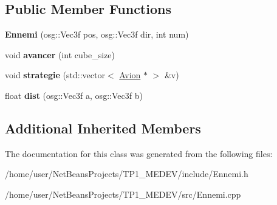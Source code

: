 \subsection*{Public Member Functions}
\begin{DoxyCompactItemize}
\item 
\hypertarget{classEnnemi_a8afacc285af46058850d5037cefd2d7b}{{\bfseries Ennemi} (osg\+::\+Vec3f pos, osg\+::\+Vec3f dir, int num)}\label{classEnnemi_a8afacc285af46058850d5037cefd2d7b}

\item 
\hypertarget{classEnnemi_a30f5463052d9349a4a3a561ca37b6f7a}{void {\bfseries avancer} (int cube\+\_\+size)}\label{classEnnemi_a30f5463052d9349a4a3a561ca37b6f7a}

\item 
\hypertarget{classEnnemi_a8929362ed06b114f62d7e1863303f1fc}{void {\bfseries strategie} (std\+::vector$<$ \hyperlink{classAvion}{Avion} $\ast$ $>$ \&v)}\label{classEnnemi_a8929362ed06b114f62d7e1863303f1fc}

\item 
\hypertarget{classEnnemi_a11ff402c118230c802da312bb3bc6a66}{float {\bfseries dist} (osg\+::\+Vec3f a, osg\+::\+Vec3f b)}\label{classEnnemi_a11ff402c118230c802da312bb3bc6a66}

\end{DoxyCompactItemize}
\subsection*{Additional Inherited Members}


The documentation for this class was generated from the following files\+:\begin{DoxyCompactItemize}
\item 
/home/user/\+Net\+Beans\+Projects/\+T\+P1\+\_\+\+M\+E\+D\+E\+V/include/Ennemi.\+h\item 
/home/user/\+Net\+Beans\+Projects/\+T\+P1\+\_\+\+M\+E\+D\+E\+V/src/Ennemi.\+cpp\end{DoxyCompactItemize}
